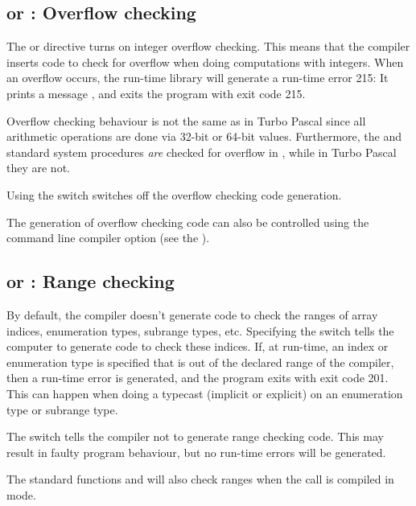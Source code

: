 \subsection{ or : Overflow checking}
The  or  directive turns on
integer overflow checking. This means that the compiler inserts code
to check for overflow when doing computations with integers.
When an overflow occurs, the run-time library will generate a run-time error
215: It prints a message , and exits the program with exit code 215.

\begin{remark}Overflow checking behaviour is not the same as in
Turbo Pascal since all arithmetic operations are done via 32-bit or
64-bit values. Furthermore, the  and  standard system
procedures {\em are} checked for overflow in \fpc, while in Turbo
Pascal they are not.
\end{remark}
Using the  switch switches off the overflow checking code
generation.

The generation of overflow checking code can also be controlled
using the  command line compiler option (see the \userref).

\subsection{ or  : Range checking}

By default, the compiler doesn't generate code to check the ranges of array
indices, enumeration types, subrange types, etc. Specifying the
 switch tells the computer to generate code to check these
indices. If, at run-time, an index or enumeration type is specified that is
out of the declared range of the compiler, then a run-time error is
generated, and the program exits with exit code 201. This can happen when
doing a typecast (implicit or explicit) on an enumeration type or subrange
type.

The  switch tells the compiler not to generate range checking
code. This may result in faulty program behaviour, but no run-time errors
will be generated.

\begin{remark}The standard functions  and  will also check ranges
when the call is compiled in  mode.
\end{remark}

